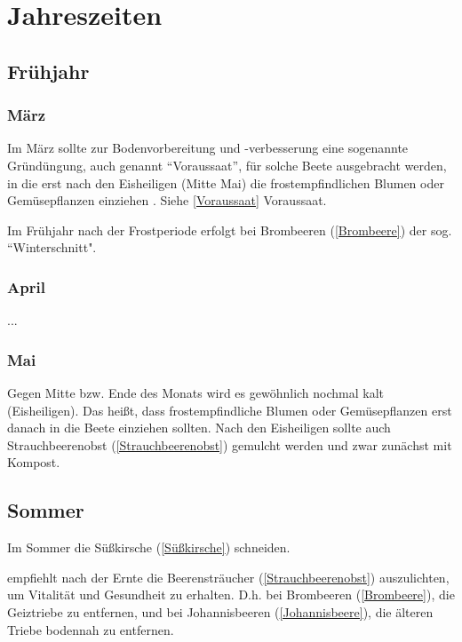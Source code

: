 	
\chapter{Jahreszeiten}

	
\section{Frühjahr}

\subsection{März}
\label{März}
Im März sollte zur Bodenvorbereitung und -verbesserung eine sogenannte Gründüngung, auch genannt ``Voraussaat'', für solche Beete ausgebracht werden, in die erst nach den Eisheiligen (Mitte Mai) die frostempfindlichen Blumen oder Gemüsepflanzen einziehen \citep[S.~11]{Heberer2018} \cite{Heberer2018}.
Siehe \ref{Voraussaat} Voraussaat.

Im Frühjahr nach der Frostperiode erfolgt bei Brombeeren (\ref{Brombeere}) der sog. ``Winterschnitt".

\subsection{April}

...

\subsection{Mai}

Gegen Mitte bzw. Ende des Monats wird es gewöhnlich nochmal kalt (Eisheiligen).
Das heißt, dass frostempfindliche Blumen oder Gemüsepflanzen erst danach in die Beete einziehen sollten.
Nach den Eisheiligen sollte auch \textrightarrow Strauchbeerenobst (\ref{Strauchbeerenobst}) gemulcht werden und zwar zunächst mit Kompost.

\section{Sommer}

Im Sommer die Süßkirsche (\ref{Süßkirsche}) schneiden.

\citet[S.~11]{Heberer2018} empfiehlt nach der Ernte die Beerensträucher (\ref{Strauchbeerenobst}) auszulichten, um Vitalität und Gesundheit zu erhalten.
D.h. bei Brombeeren (\ref{Brombeere}), die Geiztriebe zu entfernen, und bei Johannisbeeren (\ref{Johannisbeere}), die älteren Triebe bodennah zu entfernen.

